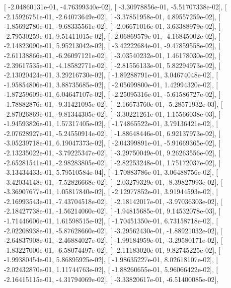 \documentclass{article}
\begin{document}
       [ -2.04860131e-01,  -4.76399340e-02],
       [ -3.30978856e-01,  -5.51707338e-02],
       [ -2.15926751e-01,  -2.64073649e-02],
       [ -3.37851958e-01,   4.89557259e-02],
       [ -1.85692780e-01,  -9.68335561e-02],
       [ -2.06671016e-01,   3.63388979e-02],
       [ -2.79530259e-01,   9.51411015e-02],
       [ -2.06869579e-01,  -4.16845002e-02],
       [ -2.14823090e-01,   5.95213042e-02],
       [ -3.42222684e-01,  -9.47859558e-02],
       [ -2.61138866e-01,  -6.26097121e-02],
       [ -3.03540232e-01,   1.46178030e-02],
       [ -2.39617535e-01,  -4.18582771e-02],
       [ -2.81556133e-01,   5.82294973e-02],
       [ -2.13020424e-01,   3.29216730e-02],
       [ -1.89288791e-01,   3.04674048e-02],
       [ -1.95854806e-01,   3.88735685e-02],
       [ -2.05699800e-01,   1.42994320e-02],
       [ -1.87259609e-01,   6.04647107e-02],
       [ -2.25095316e-01,  -5.61586727e-02],
       [ -1.78882876e-01,  -9.31421095e-02],
       [ -2.16673760e-01,  -5.28571932e-03],
       [ -2.87026869e-01,  -9.81344305e-02],
       [ -3.30221261e-01,   1.15566038e-03],
       [ -1.94593826e-01,   1.57317405e-02],
       [ -1.74865522e-01,   3.79136421e-02],
       [ -2.07628927e-01,  -5.24550914e-02],
       [ -1.88648446e-01,   6.92137973e-02],
       [ -3.05239718e-01,   6.19047373e-02],
       [ -2.04399891e-01,  -5.91669365e-02],
       [ -2.13235022e-01,  -3.79225347e-02],
       [ -3.29750049e-01,   9.26263556e-02],
       [ -2.65281541e-01,  -2.98283805e-02],
       [ -2.82253248e-01,   1.75172037e-02],
       [ -3.13434433e-01,   5.79510584e-04],
       [ -1.70883786e-01,   3.06488756e-02],
       [ -3.42034148e-01,  -7.52826668e-02],
       [ -2.03279329e-01,  -8.39827993e-02],
       [ -3.36907677e-01,   1.05817840e-02],
       [ -2.12977852e-01,   3.91944593e-02],
       [ -2.16993543e-01,  -7.43704518e-02],
       [ -2.18142017e-01,  -3.97036303e-02],
       [ -2.18427738e-01,  -1.56214060e-02],
       [ -1.94815685e-01,   9.14532078e-03],
       [ -1.71446606e-01,   1.61598515e-02],
       [ -1.70451350e-01,   6.73158718e-02],
       [ -2.02208938e-01,  -5.87628660e-02],
       [ -3.29562430e-01,  -1.88921032e-02],
       [ -2.64837908e-01,  -2.46884027e-02],
       [ -1.99184959e-01,  -3.29580171e-02],
       [ -1.83227000e-01,  -6.58074497e-02],
       [ -2.11183020e-01,   9.82745225e-02],
       [ -1.99380454e-01,   5.86895925e-02],
       [ -1.98635227e-01,   8.02618107e-02],
       [ -2.02432870e-01,   1.11744763e-02],
       [ -1.88260655e-01,   5.96066422e-02],
       [ -2.16415115e-01,  -4.31794069e-02],
       [ -3.33820617e-01,  -6.51400085e-02],
\end{document}
